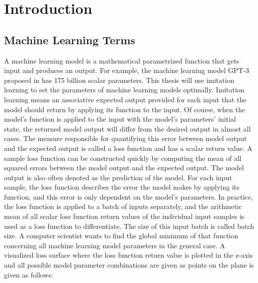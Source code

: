 \documentclass[draft,final]{vutinfth} %
\begin{document}

    \tableofcontents %

    \mainmatter


    \chapter{Introduction}


    \section{Machine Learning Terms}
    A machine learning model is a mathematical parametrized function that gets input and produces an output.
    For example, the machine learning model GPT-3 proposed in \cite{GPT-3} has 175 billion scalar parameters.
    This thesis will use imitation learning to set the parameters of machine learning models optimally.
    Imitation learning means an associative expected output provided for each input that the model should return by applying its function to the input.
    Of course, when the model's function is applied to the input with the model's parameters' initial state, the returned model output will differ from the desired output in almost all cases.
    The measure responsible for quantifying this error between model output and the expected output is called a loss function and has a scalar return value.
    A sample loss function can be constructed quickly by computing the mean of all squared errors between the model output and the expected output.
    The model output is also often denoted as the prediction of the model.
    For each input sample, the loss function describes the error the model makes by applying its function, and this error is only dependent on the model's parameters.
    In practice, the loss function is applied to a batch of inputs separately, and the arithmetic mean of all scalar loss function return values of the individual input samples is used as a loss function to differentiate.
    The size of this input batch is called batch size.
    A computer scientist wants to find the global minimum of that function concerning all machine learning model parameters in the general case.
    A visualized loss surface where the loss function return value is plotted in the z-axis and all possible model parameter combinations are given as points on the plane is given as follows:
\end{document}
